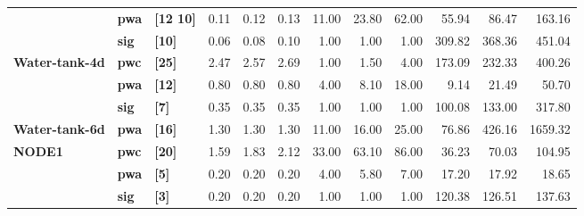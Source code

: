 \begin{tabular}{lllrrrrrrrrr}
                            & \textbf{pwa}      & \textbf{[12 10]} & 0.11                                 & 0.12                    & 0.13                    & 11.00  & 23.80 & 62.00  & 55.94  & 86.47  & 163.16  \\
                            & \textbf{sig}      & \textbf{[10]}    & 0.06                                 & 0.08                    & 0.10                    & 1.00   & 1.00  & 1.00   & 309.82 & 368.36 & 451.04  \\
    \textbf{Water-tank-4d}  & \textbf{pwc}      & \textbf{[25]}    & 2.47                                 & 2.57                    & 2.69                    & 1.00   & 1.50  & 4.00   & 173.09 & 232.33 & 400.26  \\
                            & \textbf{pwa}      & \textbf{[12]}    & 0.80                                 & 0.80                    & 0.80                    & 4.00   & 8.10  & 18.00  & 9.14   & 21.49  & 50.70   \\
                            & \textbf{sig}      & \textbf{[7]}     & 0.35                                 & 0.35                    & 0.35                    & 1.00   & 1.00  & 1.00   & 100.08 & 133.00 & 317.80  \\
    \textbf{Water-tank-6d}  & \textbf{pwa}      & \textbf{[16]}    & 1.30                                 & 1.30                    & 1.30                    & 11.00  & 16.00 & 25.00  & 76.86  & 426.16 & 1659.32 \\
    \textbf{NODE1}          & \textbf{pwc}      & \textbf{[20]}    & 1.59                                 & 1.83                    & 2.12                    & 33.00  & 63.10 & 86.00  & 36.23  & 70.03  & 104.95  \\
                            & \textbf{pwa}      & \textbf{[5]}     & 0.20                                 & 0.20                    & 0.20                    & 4.00   & 5.80  & 7.00   & 17.20  & 17.92  & 18.65   \\
                            & \textbf{sig}      & \textbf{[3]}     & 0.20                                 & 0.20                    & 0.20                    & 1.00   & 1.00  & 1.00   & 120.38 & 126.51 & 137.63  \\
    \bottomrule
\end{tabular}
